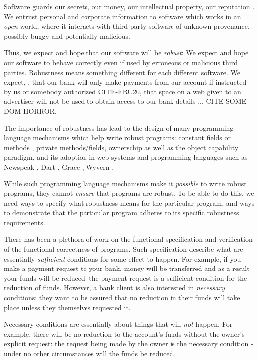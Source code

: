 Software guards our secrets, our money, our intellectual property,
our reputation \cite{covfefe}.  We entrust personal and
corporate information to software which works in an \emph{open} world, 
where  it interacts with %
third party software of unknown provenance, possibly buggy and potentially malicious.

Thus, we expect and hope that our software will be \emph{robust}:
We expect and hope our software to behave correctly even if  used 
by erroneous or malicious third parties. Robustness means 
something different for each different software.
 We expect, \eg, that our bank will only make payments 
from our account if instructed by us or somebody authorized CITE-ERC20,
that  space on a web given to an advertiser will not be used
to obtain access to our bank details ... CITE-SOME-DOM-HORROR.

The importance of robustness has lead to the design of many programming
language mechanisms which help write robust programs:
constant fields or methods \cite{...}, private methods/fields\cite{...}, ownerschip\cite{...}
as well as the object capability paradigm\cite{millerPhDThesis},
and its adoption in  web systems
\cite{CapJavaHayesAPLAS17,CapNetSocc17Eide,DOCaT14} and programming languages such as Newspeak
\cite{newspeak17}, Dart \cite{dart15}, Grace \cite{grace,graceClasses}, Wyvern \cite{wyverncapabilities}.

While such programming language mechanisms make it \textit{possible} to write robust
programs, they cannot \textit{ensure} that programs are robust. 
To be able to do this, we need ways to specify what robustness means for the 
particular program, and ways to demonstrate that the particular program 
adheres to its specific robustness requirements.

There has been a plethora of work on the functional specification and verification of the
functional correctness of programs. Such specification describe what are
essentially \emph{sufficient} conditions for some
effect to happen. For example, if you make a payment request to your bank, money will be transferred
and as a result your funds will be reduced: the payment request is a sufficient condition for the
reduction of funds. However, a bank client is also interested in \emph{necessary} conditions:
they want to be assured that no reduction in their funds will take place unless they themselves
requested it.

Necessary conditions are essentially about things that will  \emph{not} happen. For example,
there  will be no reduction to the account's funds without the owner's explicit request: the request being made by
the owner is the necessary condition - under no other circumstances will the funds be reduced.

